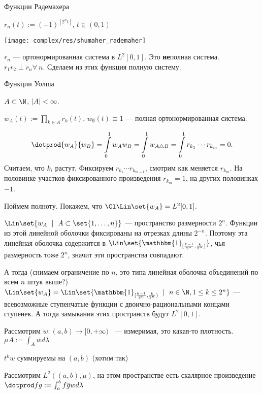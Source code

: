 \begin{example}{Функции Радемахера}

    $r_n(t) := (-1)^{[2^nt]}$, $t \in (0, 1)$

    \texttt{[image: complex/res/shumaher\_rademaher]}

    $r_n$ --- ортонормированная система в $L^2[0,1]$.
    Это \textbf{не}полная система. $r_1 r_2 \perp r_n \forall\ n$.
    Сделаем из этих функция полную систему.
\end{example}

\begin{example}{Функции Уолша}

    $A \subset \N$, $|A| < \infty$.

    $w_A(t) := \prod_{k \in A} r_k(t)$, $w_{\emptyset}(t) \equiv 1$ --- полная ортонормированная система.

    \[\dotprod{w_A}{w_B} = \int\limits_0^1 w_A w_B = \int\limits_0^1 w_{A \triangle B} = \int\limits_0^1 r_{k_1} \cdots r_{k_m} = 0
        .\]
    Считаем, что $k_i$ растут. Фиксируем $r_{k_1} \cdots r_{k_{m-1}}$, смотрим как меняется $r_{k_m}$. На половинке участков фиксированного произведения $r_{k_m} = 1$, на других половинках $-1$.

    Поймем полноту. Покажем, что $\Cl \Lin \set{w_A} = L^2[0,1]$.

    $\Lin \set{w_A\ \mid\ A \subset \set{1, \ldots, n}}$ --- пространство размерности $2^n$.
    Функции из этой линейной оболочки фиксированы на отрезках длины $2^{-n}$.
    Поэтому эта линейная оболочка содержится в $\Lin \set{\mathbbm{1}_{[\frac{k-1}{2^n}, \frac{k}{2^n})}}$, чья размерность тоже $2^n$, значит эти пространства совпадают.

    А тогда (снимаем ограничение по $n$, это типа линейная оболочка объединений по всем $n$ штук выше?) $\Lin \set{w_A} = \Lin \set{\mathbbm{1}_{[\frac{k-1}{2^n}, \frac{k}{2^n})}\ \mid\ n \in \N, 1 \leq k \leq 2^n}$ --- всевозможные ступенчатые функции с двоично-рациональными концами ступенек. А тогда замыкания этих пространств будут $L^2[0,1]$.
\end{example}

Рассмотрим $w: (a, b) \rightarrow [0, +\infty)$ ~--- измеримая, это какая-то плотность.
 $\mu A := \int_A w d\lambda$
 
 $t^k w$ суммируемы на $(a,b)$ (хотим так)
 
 Рассмотрим $L^2((a, b), \mu)$, на этом пространстве есть скалярное произведение
 $\dotprod fg := \int_a^b f\overline{g} w d\lambda$
 

